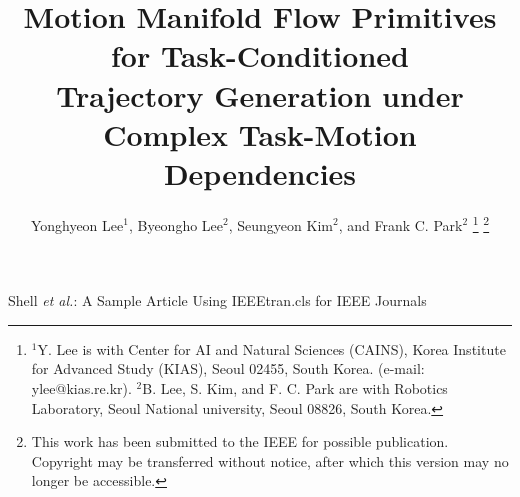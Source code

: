 \documentclass[lettersize,journal]{IEEEtran}
\begin{document}
\title{Motion Manifold Flow Primitives for Task-Conditioned \\ Trajectory Generation under Complex Task-Motion Dependencies}

\author{
 {Yonghyeon Lee$^{1}$, Byeongho Lee$^{2}$, Seungyeon Kim$^{2}$, and Frank C. Park$^{2}$}
 \thanks{$^{1}$Y. Lee is with Center for AI and Natural Sciences (CAINS), Korea Institute for Advanced Study (KIAS), Seoul 02455, South Korea.  (e-mail: ylee@kias.re.kr). $^{2}$B. Lee, S. Kim, and F. C. Park are with Robotics Laboratory, Seoul National university, Seoul 08826, South Korea.}
 \thanks{This work has been submitted to the IEEE for possible publication. Copyright may be transferred without notice, after which this version may no longer be accessible.}
 }

%
{Shell \MakeLowercase{\textit{et al.}}: A Sample Article Using IEEEtran.cls for IEEE Journals}


\maketitle
\end{document}

